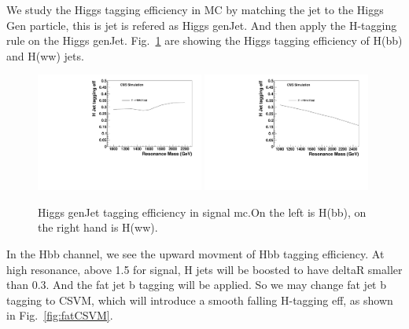 
We study the Higgs tagging efficiency in MC by matching the jet to the Higgs Gen particle, 
this is jet is refered as Higgs genJet. 
And then apply the H-tagging rule on the Higgs genJet.
Fig.~\ref{fig:HEff} are showing the Higgs tagging efficiency 
of H(bb) and H(ww) jets. 


\begin{figure}[htb]
\begin{center}
\includegraphics[width=0.49\textwidth]{HbbZqqfigs/Signal/H-taggingEff-8TeV.pdf}
\includegraphics[width=0.49\textwidth]{HqqqqZqqfigs/Signal/H-taggingEff-8TeV.pdf}
\end{center}
\caption{
Higgs genJet tagging efficiency in signal mc.On the left is H(bb), on the right hand is H(ww).  
}
\label{fig:HEff}
\end{figure}

In the Hbb channel, we see the upward movment of Hbb tagging efficiency. At high resonance, above 1.5 \TeVc
for signal,  H jets will be boosted to have deltaR smaller than 0.3. And the fat jet b tagging will be applied. 
So we may change fat jet b tagging to CSVM, which will introduce a smooth falling H-tagging eff, as shown in 
Fig.~\ref{fig:fatCSVM}. 


